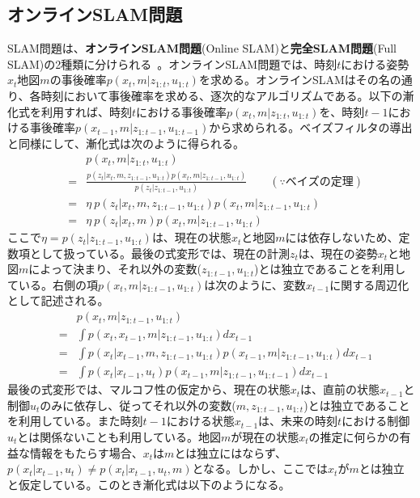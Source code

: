 \documentclass[dvipdfmx,a4paper]{jsarticle}
\begin{document}
\subsection{オンラインSLAM問題}
SLAM問題は、\textbf{オンラインSLAM問題}(Online SLAM)と\textbf{完全SLAM問題}(Full SLAM)の2種類に分けられる~\cite{Thrun07}\cite{Hara16}。オンラインSLAM問題では、時刻$t$における姿勢$x_t$地図$m$の事後確率$p(x_t, m | z_{1 : t}, u_{1 : t})$を求める。オンラインSLAMはその名の通り、各時刻において事後確率を求める、逐次的なアルゴリズムである。以下の漸化式を利用すれば、時刻$t$における事後確率$p(x_t, m | z_{1 : t}, u_{1 : t})$を、時刻$t - 1$における事後確率$p(x_{t - 1}, m | z_{1 : t - 1}, u_{1 : t - 1})$から求められる。ベイズフィルタの導出と同様にして、漸化式は次のように得られる。
\begin{eqnarray}
	&& p(x_t, m | z_{1 : t}, u_{1 : t}) \nonumber \\
	&=& \frac{p(z_t | x_t, m, z_{1 : t - 1}, u_{1 : t}) p(x_t, m | z_{1 : t - 1}, u_{1 : t})}{p(z_t | z_{1 : t - 1}, u_{1 : t})} \qquad (\because ベイズの定理) \\
	&=& \eta \ p(z_t | x_t, m, z_{1 : t - 1}, u_{1 : t}) p(x_t, m | z_{1 : t - 1}, u_{1 : t}) \\
	&=& \eta \ p(z_t | x_t, m) p(x_t, m | z_{1 : t - 1}, u_{1 : t})
\end{eqnarray}
ここで$\eta = p(z_t | z_{1 : t - 1}, u_{1 : t})$は、現在の状態$x_t$と地図$m$には依存しないため、定数項として扱っている。最後の式変形では、現在の計測$z_t$は、現在の姿勢$x_t$と地図$m$によって決まり、それ以外の変数($z_{1 : t - 1}, u_{1 : t}$)とは独立であることを利用している。右側の項$p(x_t, m | z_{1 : t - 1}, u_{1 : t})$は次のように、変数$x_{t - 1}$に関する周辺化として記述される。
\begin{eqnarray}
	&& p(x_t, m | z_{1 : t - 1}, u_{1 : t}) \nonumber \\
	&=& \int p(x_t, x_{t - 1}, m | z_{1 : t - 1}, u_{1 : t}) dx_{t - 1} \\
	&=& \int p(x_t | x_{t - 1}, m, z_{1 : t - 1}, u_{1 : t}) p(x_{t - 1}, m | z_{1 : t - 1}, u_{1 : t}) dx_{t - 1} \\
	&=& \int p(x_t | x_{t - 1}, u_t) p(x_{t - 1}, m | z_{1 : t - 1}, u_{1 : t - 1}) dx_{t - 1}
\end{eqnarray}
最後の式変形では、マルコフ性の仮定から、現在の状態$x_t$は、直前の状態$x_{t - 1}$と制御$u_t$のみに依存し、従ってそれ以外の変数($m, z_{1 : t - 1}, u_{1 : t}$)とは独立であることを利用している。また時刻$t - 1$における状態$x_{t - 1}$は、未来の時刻$t$における制御$u_t$とは関係ないことも利用している。地図$m$が現在の状態$x_t$の推定に何らかの有益な情報をもたらす場合、$x_t$は$m$とは独立にはならず、$p(x_t | x_{t - 1}, u_t) \neq p(x_t | x_{t - 1}, u_t, m)$となる。しかし、ここでは$x_t$が$m$とは独立と仮定している。このとき漸化式は以下のようになる。
\end{document}
